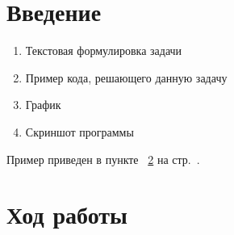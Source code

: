 \documentclass[12pt,a4paper]{scrartcl}
\begin{document}
	\section{Введение}
	\label{sec:intro}
	
	\begin{enumerate}
		\item Текстовая формулировка задачи
		\item Пример кода, решающего данную задачу
		\item График
		\item Скриншот программы
	\end{enumerate}
	
	Пример приведен в пункте ~\ref{sec:exp} на стр.~\pageref{sec:exp}.
	
	\section{Ход работы}
	\label{sec:exp}
	
\end{document}
